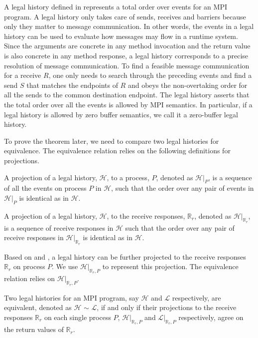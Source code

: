 A legal history defined in  represents a total order over events for an MPI program. A legal history only takes care of sends, receives and barriers because only they matter to message communication. In other words, the events in a legal history can be used to evaluate how messages may flow in a runtime system. Since the arguments are concrete in any method invocation and the return value is also concrete in any method response, a legal history corresponds to a precise resolution of message communication. To find a feasible message communication for a receive $R$, one only needs to search through the preceding events and find a send $S$ that matches the endpoints of $R$ and obeys the non-overtaking order for all the sends to the common destination endpoint. The legal history asserts that the total order over all the events is allowed by MPI semantics. In particular, if a legal history is allowed by zero buffer semantics, we call it a zero-buffer legal history.

To prove the theorem later, we need to compare two legal histories for equivalence. The equivalence relation relies on the following definitions for projections.

\begin{definition}\label{def:projection_process}
A projection of a legal history, $\mathcal{H}$, to a process, $P$, denoted as $\mathcal{H} | _P$, is a sequence of all the events on process $P$ in $\mathcal{H}$, such that the order over any pair of events in $\mathcal{H} | _P$ is identical as in $\mathcal{H}$.
\end{definition}

\begin{definition}\label{def:projection_receive}
A projection of a legal history, $\mathcal{H}$, to the receive responses, $\mathbb{R}_r$, denoted as $\mathcal{H} | _{\mathbb{R}_r}$, is a sequence of receive responses in $\mathcal{H}$ such that the order over any pair of receive responses in $\mathcal{H} | _{\mathbb{R}_r}$ is identical as in $\mathcal{H}$.
\end{definition}

Based on  and , a legal history can be further projected to the receive responses $\mathbb{R}_r$ on process $P$. We use $\mathcal{H} | _{\mathbb{R}_r,P}$ to represent this projection. The equivalence relation relies on $\mathcal{H} | _{\mathbb{R}_r,P}$.

\begin{definition}\label{def:er}
Two legal histories for an MPI program, say $\mathcal{H}$ and $\mathcal{L}$ respectively, are equivalent, denoted as $\mathcal{H}$ $\sim$ $\mathcal{L}$, if and only if their projections to the receive responses $\mathbb{R}_r$ on each single process $P$, $\mathcal{H} | _{\mathbb{R}_r,P}$ and $\mathcal{L} | _{\mathbb{R}_r,P}$ respectively, agree on the return values of $\mathbb{R}_r$.
\end{definition}

